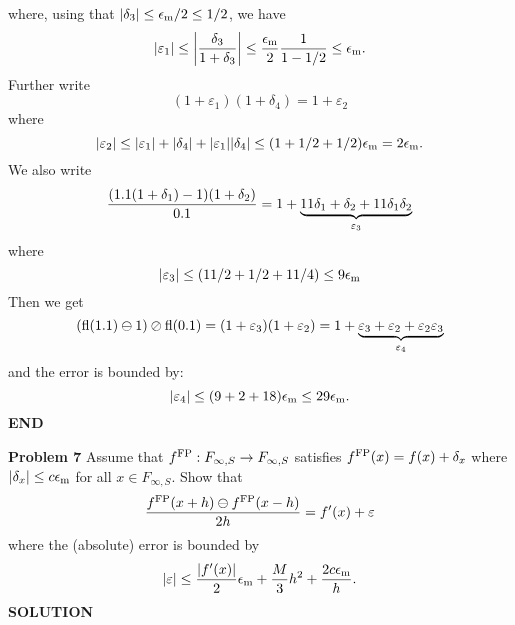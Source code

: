\documentclass[12pt,a4paper]{article}
\begin{document}
where, using that $|\ensuremath{\delta}_3| \ensuremath{\leq} \ensuremath{\epsilon}_{\rm m}/2 \ensuremath{\leq} 1/2$, we have
\[
|\ensuremath{\varepsilon}_1| \ensuremath{\leq} \left| {\ensuremath{\delta}_3 \over 1 + \ensuremath{\delta}_3} \right| \ensuremath{\leq}  {\ensuremath{\epsilon}_{\rm m} \over 2} {1 \over 1 - 1/2} \ensuremath{\leq} \ensuremath{\epsilon}_{\rm m}.
\]
Further write
\[
(1 + \ensuremath{\varepsilon}_1)(1 + \ensuremath{\delta}_4) = 1 + \ensuremath{\varepsilon}_2
\]
where
\[
|\ensuremath{\varepsilon}_2| \ensuremath{\leq} |\ensuremath{\varepsilon}_1| + |\ensuremath{\delta}_4| + |\ensuremath{\varepsilon}_1| |\ensuremath{\delta}_4| \ensuremath{\leq} (1 + 1/2 + 1/2) \ensuremath{\epsilon}_{\rm m} =   2\ensuremath{\epsilon}_{\rm m}.
\]
We also write
\[
{(1.1 (1 + \ensuremath{\delta}_1) - 1)(1 + \ensuremath{\delta}_2) \over 0.1} = 1 + \underbrace{11\ensuremath{\delta}_1 + \ensuremath{\delta}_2 + 11\ensuremath{\delta}_1\ensuremath{\delta}_2}_{\ensuremath{\varepsilon}_3}
\]
where
\[
|\ensuremath{\varepsilon}_3| \ensuremath{\leq} (11/2 + 1/2  + 11/4) \ensuremath{\leq} 9 \ensuremath{\epsilon}_{\rm m}
\]
Then we get
\[
({\rm fl}(1.1) \ensuremath{\ominus} 1) \ensuremath{\oslash} {\rm fl}(0.1) = (1 + \ensuremath{\varepsilon}_3) (1 + \ensuremath{\varepsilon}_2) =  1 + \underbrace{\ensuremath{\varepsilon}_3 + \ensuremath{\varepsilon}_2 + \ensuremath{\varepsilon}_2 \ensuremath{\varepsilon}_3}_{\ensuremath{\varepsilon}_4}
\]
and the error is bounded by:
\[
|\ensuremath{\varepsilon}_4| \ensuremath{\leq} (9 + 2 + 18) \ensuremath{\epsilon}_{\rm m} \ensuremath{\leq} 29 \ensuremath{\epsilon}_{\rm m}.
\]
\textbf{END}

\textbf{Problem 7} Assume that $f^{\rm FP} : F_{\ensuremath{\infty},S} \ensuremath{\rightarrow} F_{\ensuremath{\infty},S}$ satisfies $f^{\rm FP}(x) = f(x) + \ensuremath{\delta}_x$ where $|\ensuremath{\delta}_x| \ensuremath{\leq} c \ensuremath{\epsilon}_{\rm m}$ for all $x \ensuremath{\in} F_{\ensuremath{\infty},S}$. Show that
\[
{f^{\rm FP}(x+h) \ensuremath{\ominus} f^{\rm FP}(x-h) \over  2h} = f'(x) + \ensuremath{\varepsilon}
\]
where the (absolute) error is bounded by
\[
|\ensuremath{\varepsilon}| \ensuremath{\leq} {|f'(x)| \over 2} \ensuremath{\epsilon}_{\rm m} + {M \over 3} h^2 + {2 c \ensuremath{\epsilon}_{\rm m} \over h}.
\]
\textbf{SOLUTION}
\end{document}
